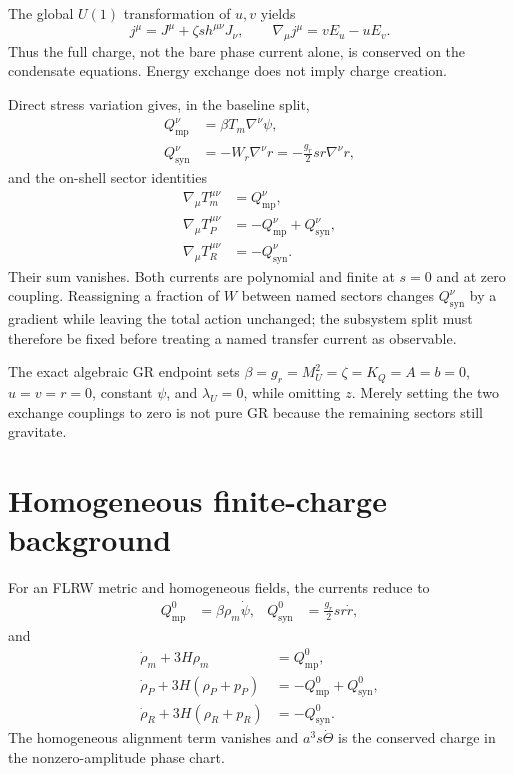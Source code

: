 \documentclass[aps,prd,reprint,superscriptaddress,nofootinbib,floatfix]{revtex4-2}
\newcommand{\Qmp}{Q_{\mathrm{mp}}}
\newcommand{\Qsyn}{Q_{\mathrm{syn}}}
\begin{document}
The global \(U(1)\) transformation of \(u,v\) yields
\begin{equation}
 j^\mu=J^\mu+\zeta s h^{\mu\nu}J_\nu,
 \qquad
 \nabla_\mu j^\mu=vE_u-uE_v .
 \label{eq:noether}
\end{equation}
Thus the full charge, not the bare phase current alone, is conserved on the
condensate equations.  Energy exchange does not imply charge creation.

Direct stress variation gives, in the baseline split,
\begin{align}
 \Qmp^\nu&=\beta T_m\nabla^\nu\psi,\\
 \Qsyn^\nu&=-W_r\nabla^\nu r
 =-\frac{g_r}{2}s r\nabla^\nu r,
 \label{eq:currents}
\end{align}
and the on-shell sector identities
\begin{align}
 \nabla_\mu T_m^{\mu\nu}&=\Qmp^\nu,\\
 \nabla_\mu T_P^{\mu\nu}&=-\Qmp^\nu+\Qsyn^\nu,\\
 \nabla_\mu T_R^{\mu\nu}&=-\Qsyn^\nu .
 \label{eq:balances}
\end{align}
Their sum vanishes.  Both currents are polynomial and finite at \(s=0\) and
at zero coupling.  Reassigning a fraction of \(W\) between named sectors
changes \(\Qsyn^\nu\) by a gradient while leaving the total action unchanged;
the subsystem split must therefore be fixed before treating a named transfer
current as observable.

The exact algebraic GR endpoint sets
\(\beta=g_r=M_U^2=\zeta=K_Q=A=b=0\), \(u=v=r=0\), constant \(\psi\), and
\(\lambda_U=0\), while omitting \(z\).  Merely setting the two exchange
couplings to zero is not pure GR because the remaining sectors still gravitate.

\section{Homogeneous finite-charge background}
\label{sec:background}

For an FLRW metric and homogeneous fields, the currents reduce to
\begin{align}
 \Qmp^0&=\beta\rho_m\dot\psi,&
 \Qsyn^0&=\frac{g_r}{2}s r\dot r,
\end{align}
and
\begin{align}
 \dot\rho_m+3H\rho_m&=\Qmp^0,\\
 \dot\rho_P+3H(\rho_P+p_P)&=-\Qmp^0+\Qsyn^0,\\
 \dot\rho_R+3H(\rho_R+p_R)&=-\Qsyn^0.
 \label{eq:background-balances}
\end{align}
The homogeneous alignment term vanishes and
\(a^3s\dot\Theta\) is the conserved charge in the nonzero-amplitude phase
chart.
\end{document}
